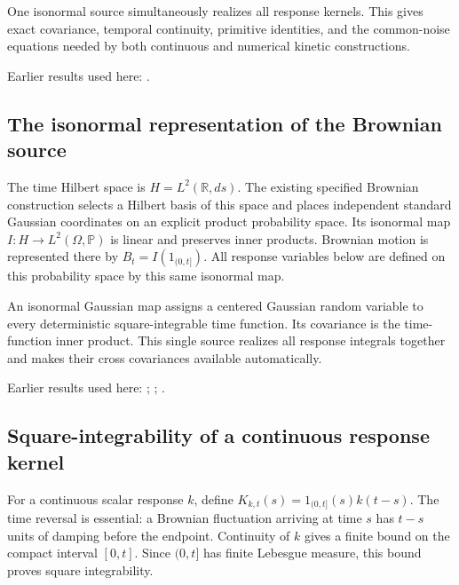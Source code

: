 \documentclass[11pt,a4paper]{report}
\begin{document}
One isonormal source simultaneously realizes all response kernels. This gives exact covariance, temporal continuity, primitive identities, and the common-noise equations needed by both continuous and numerical kinetic constructions.



Earlier results used here: \cite[Section~3.8]{LangevinLean2026ULASC}.
\subsection{\texorpdfstring{The isonormal representation of the Brownian source}{The isonormal representation of the Brownian source}}
\label{report-step-KineticLangevin-BrownianConvolution-lean-1}


The time Hilbert space is \(H=L^2(\mathbb R,ds)\). The existing specified Brownian construction selects a Hilbert basis of this space and places independent standard Gaussian coordinates on an explicit product probability space. Its isonormal map \(I:H\to L^2(\Omega,\mathbb P)\) is linear and preserves inner products. Brownian motion is represented there by \(B_t=I(1_{(0,t]})\). All response variables below are defined on this probability space by this same isonormal map.



An isonormal Gaussian map assigns a centered Gaussian random variable to every deterministic square-integrable time function. Its covariance is the time-function inner product. This single source realizes all response integrals together and makes their cross covariances available automatically.



Earlier results used here: \cite[Section~3.8.1]{LangevinLean2026ULASC}; \cite[Section~3.8.6]{LangevinLean2026ULASC}; \cite[Section~3.8.7]{LangevinLean2026ULASC}.
\subsection{\texorpdfstring{Square-integrability of a continuous response kernel}{Square-integrability of a continuous response kernel}}
\label{report-step-KineticLangevin-BrownianConvolution-lean-2}


For a continuous scalar response \(k\), define \(K_{k,t}(s)=1_{(0,t]}(s)k(t-s)\). The time reversal is essential: a Brownian fluctuation arriving at time \(s\) has \(t-s\) units of damping before the endpoint. Continuity of \(k\) gives a finite bound on the compact interval \([0,t]\). Since \((0,t]\) has finite Lebesgue measure, this bound proves square integrability.
\end{document}
